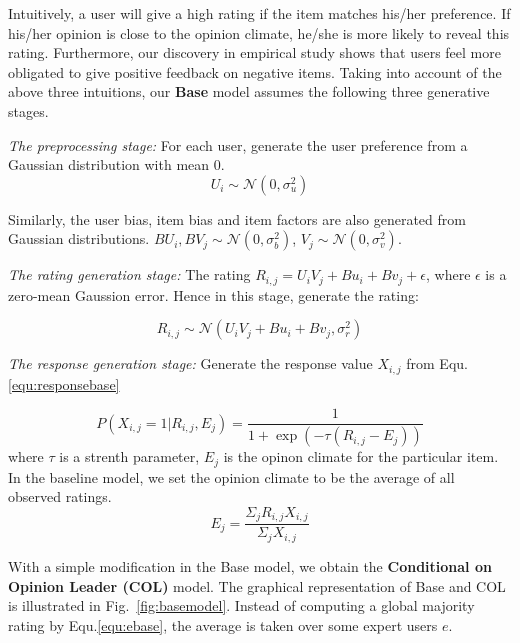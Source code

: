 \documentclass{sig-alternate}
\begin{document}
Intuitively, a user will give a high rating if the item matches his/her preference. If his/her opinion is close to the opinion climate, he/she is more likely to reveal this rating. Furthermore, our  discovery in  empirical study shows that users feel more obligated to give positive feedback on negative items. Taking into account of the above three intuitions, our \textbf{Base} model assumes the following three generative stages.

\textit{The preprocessing stage:} For each user, generate the user preference from a Gaussian distribution with mean $0$.
\begin{equation}\label{equ:preferencebase}
U_i \sim \mathcal{N}(0,\sigma_u^2)
\end{equation}

Similarly, the user bias, item bias and item factors are also generated from Gaussian distributions. $BU_i, BV_j \sim \mathcal{N}(0,\sigma_b^2)$,  $V_j \sim \mathcal{N}(0,\sigma_v^2)$.

\textit{The rating generation stage:} The rating $R_{i,j}=U_iV_j+Bu_i + Bv_j +\epsilon$, where $\epsilon$ is a zero-mean Gaussion error. Hence in this stage, generate the rating: 

\begin{equation}\label{equ:rating}
R_{i,j} \sim \mathcal{N}(U_iV_j+Bu_i+Bv_j, \sigma_r^2)
\end{equation}

\textit{The response generation stage:} Generate the response value $X_{i,j}$ from Equ.\ref{equ:responsebase}

\begin{equation}\label{equ:responsebase}
 P(X_{i,j}=1|R_{i,j},E_j)=\frac{1}{1+\exp{(-\tau(R_{i,j}-E_j))}}
\end{equation}
 where $\tau$ is a strenth parameter, $E_j$ is the opinon climate for the particular item. In the baseline model, we set the opinion climate to be the average of all observed ratings.
\begin{equation}\label{equ:ebase}
 E_j=\frac{\Sigma_jR_{i,j}X_{i,j}}{\Sigma_j X_{i,j}}
\end{equation}


With a simple modification in the Base model, we obtain the \textbf{Conditional on Opinion Leader (COL)} model. The graphical representation of Base and COL is illustrated in Fig.~\ref{fig:basemodel}. Instead of computing a global majority rating by Equ.\ref{equ:ebase}, the average is taken over some expert users $e$.
\end{document}
